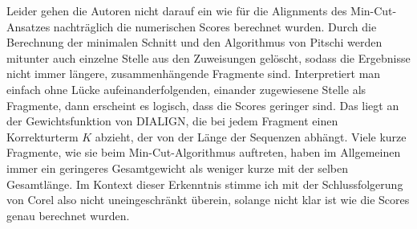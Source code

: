 Leider gehen die Autoren nicht darauf ein wie für die Alignments des Min-Cut-Ansatzes nachträglich die numerischen Scores berechnet wurden. Durch die Berechnung der minimalen Schnitt und den Algorithmus von Pitschi werden mitunter auch einzelne Stelle aus den Zuweisungen gelöscht, sodass die Ergebnisse nicht immer längere, zusammenhängende Fragmente sind. Interpretiert man einfach ohne Lücke aufeinanderfolgenden, einander zugewiesene Stelle als Fragmente, dann erscheint es logisch, dass die Scores geringer sind. Das liegt an der Gewichtsfunktion von DIALIGN, die bei jedem Fragment einen Korrekturterm $K$ abzieht, der von der Länge der Sequenzen abhängt. Viele kurze Fragmente, wie sie beim Min-Cut-Algorithmus auftreten, haben im Allgemeinen immer ein geringeres Gesamtgewicht als weniger kurze mit der selben Gesamtlänge. Im Kontext dieser Erkenntnis stimme ich mit der Schlussfolgerung von Corel also nicht uneingeschränkt überein, solange nicht klar ist wie die Scores genau berechnet wurden.